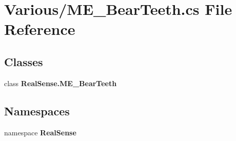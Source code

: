 \section{Various/\+M\+E\+\_\+\+Bear\+Teeth.cs File Reference}
\label{_m_e___bear_teeth_8cs}
\subsection*{Classes}
\begin{DoxyCompactItemize}
\item 
class \textbf{ Real\+Sense.\+M\+E\+\_\+\+Bear\+Teeth}
\end{DoxyCompactItemize}
\subsection*{Namespaces}
\begin{DoxyCompactItemize}
\item 
namespace \textbf{ Real\+Sense}
\end{DoxyCompactItemize}
